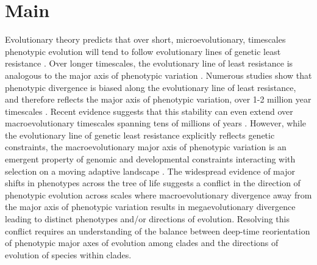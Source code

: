 \documentclass[12pt,letterpaper]{article}
\begin{document}

\section{Main}

Evolutionary theory predicts that over short, microevolutionary, timescales phenotypic evolution will tend to follow evolutionary lines of genetic least resistance \cite{schluter1996adaptive,Rhoda2022}.
Over longer timescales, the evolutionary line of least resistance is analogous to the major axis of phenotypic variation \cite{marroig2005size,fasanelli2022allometry}.
Numerous studies show that phenotypic divergence is biased along the evolutionary line of least resistance, and therefore reflects the major axis of phenotypic variation, over 1-2 million year timescales \cite{marroig2005size, mcglothlin2018adaptive, tsuboi2018}.
Recent evidence suggests that this stability can even extend over macroevolutionary timescales spanning tens of millions of years \cite{mcglothlin2018adaptive}.
However, while the evolutionary line of genetic least resistance explicitly reflects genetic constraints, the macroevolutionary major axis of phenotypic variation is an emergent property of genomic and developmental constraints interacting with selection on a moving adaptive landscape \cite{jones2004evolution}.
The widespread evidence of major shifts in phenotypes across the tree of life \cite{venditti2011multiple,khabbazian2016fast,cooney2017mega,smaers2021evolution,pagel2022general} suggests a conflict in the direction of phenotypic evolution across scales where macroevolutionary divergence away from the major axis of phenotypic variation results in megaevolutionary divergence leading to distinct phenotypes and/or directions of evolution.
Resolving this conflict requires an understanding of the balance between deep-time reorientation of phenotypic major axes of evolution among clades and the directions of evolution of species within clades.
\end{document}
